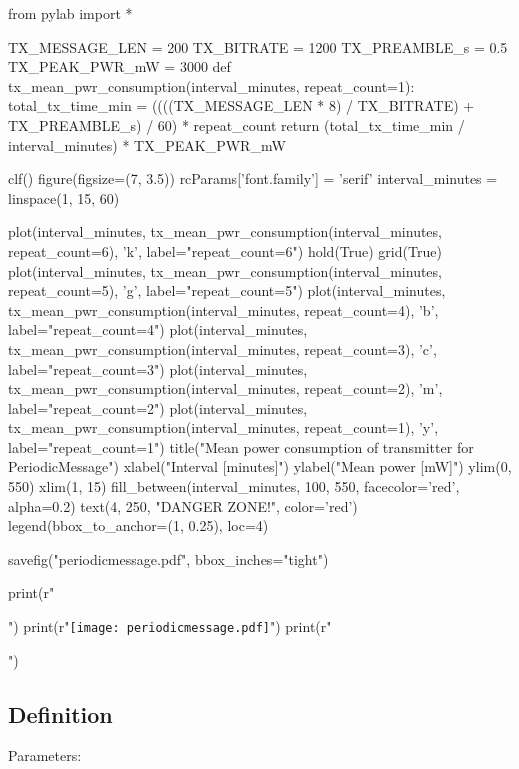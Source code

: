 \begin{pycode}
from pylab import *

TX_MESSAGE_LEN = 200
TX_BITRATE = 1200
TX_PREAMBLE_s = 0.5
TX_PEAK_PWR_mW = 3000
def tx_mean_pwr_consumption(interval_minutes, repeat_count=1):
    total_tx_time_min = ((((TX_MESSAGE_LEN * 8) / TX_BITRATE) + TX_PREAMBLE_s) / 60) * repeat_count
    return (total_tx_time_min / interval_minutes) * TX_PEAK_PWR_mW

clf()
figure(figsize=(7, 3.5))
rcParams['font.family'] = 'serif'
interval_minutes = linspace(1, 15, 60)

plot(interval_minutes, tx_mean_pwr_consumption(interval_minutes, repeat_count=6), 'k', label="repeat_count=6")
hold(True)
grid(True)
plot(interval_minutes, tx_mean_pwr_consumption(interval_minutes, repeat_count=5), 'g', label="repeat_count=5")
plot(interval_minutes, tx_mean_pwr_consumption(interval_minutes, repeat_count=4), 'b', label="repeat_count=4")
plot(interval_minutes, tx_mean_pwr_consumption(interval_minutes, repeat_count=3), 'c', label="repeat_count=3")
plot(interval_minutes, tx_mean_pwr_consumption(interval_minutes, repeat_count=2), 'm', label="repeat_count=2")
plot(interval_minutes, tx_mean_pwr_consumption(interval_minutes, repeat_count=1), 'y', label="repeat_count=1")
title("Mean power consumption of transmitter for PeriodicMessage")
xlabel("Interval [minutes]")
ylabel("Mean power [mW]")
ylim(0, 550)
xlim(1, 15)
fill_between(interval_minutes, 100, 550, facecolor='red', alpha=0.2)
text(4, 250, "DANGER ZONE!", color='red')
legend(bbox_to_anchor=(1, 0.25), loc=4)

savefig("periodicmessage.pdf", bbox_inches="tight")

print(r"\begin{center}")
print(r"\texttt{[image: periodicmessage.pdf]}")
print(r"\end{center}")
\end{pycode}

\subsection{Definition}

Parameters:

\begin{tcarglist}
\end{tcarglist}

